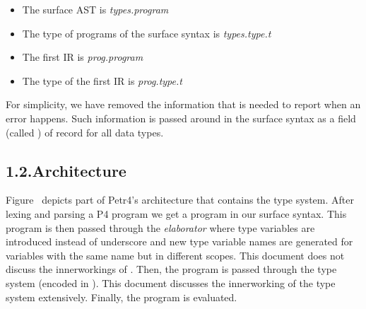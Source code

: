\documentclass[11pt]{article}
\begin{document}
{%
\begin{itemize}[noitemsep,topsep=\mdcompacttopsep]%

\item{}The surface AST is \emph{types.program}%

\item{}The type of programs of the surface syntax is \emph{types.type.t}%

\item{}The first IR is \emph{prog.program}%

\item{}The type of the first IR is \emph{prog.type.t}%
\end{itemize}%

\noindent{}For simplicity, we have removed the information that is needed to report when an error
happens. Such information is passed around in the surface syntax as a field (called
) of record for all data types.%

\subsection{1.2.\hspace*{0.5em}Architecture}%

\noindent{}Figure~ depicts part of Petr4's architecture that contains the type system.
After lexing and parsing a P4 program we get a program in our surface syntax. This
program is then passed through the \emph{elaborator} where type variables are introduced
instead of underscore and new type variable names are generated for variables with the
same name but in different scopes. This document does not discuss the innerworkings of
. Then, the program is passed through the type system (encoded in ).
This document discusses the innerworking of the type system extensively. Finally, the
program is evaluated.%

}
\end{document}
